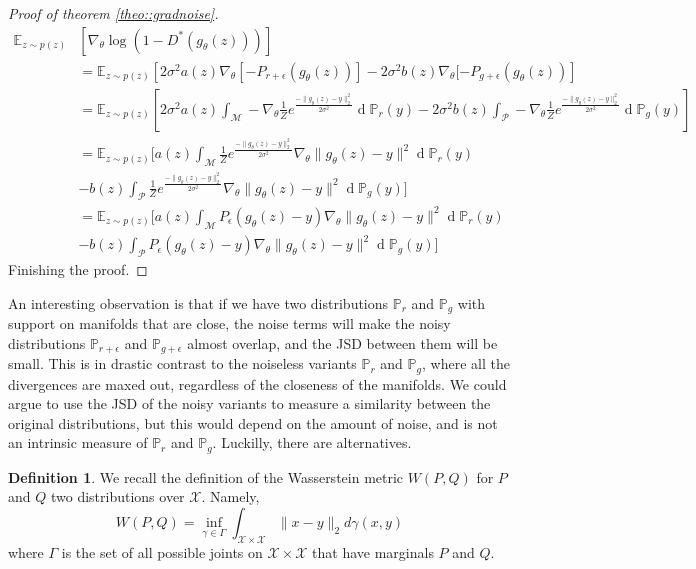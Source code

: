 \documentclass{article} %
\newcommand\EE{\mathbb{E}}
\newcommand\manP{\mathcal{P}}
\newcommand\manM{\mathcal{M}}
\newcommand\PP{\mathbb{P}}
\renewcommand{\d}[1]{\ensuremath{\operatorname{d}\!{#1}}}
\theoremstyle{definition}
\newtheorem{definition}{Definition}[section]
\begin{document}
\begin{proof}[Proof of theorem \autoref{theo::gradnoise}]
\begin{align*}
\EE_{z \sim p(z)} &\left[ \nabla_\theta \log(1 - D^*(g_\theta(z))) \right] \\
  &= \EE_{z \sim p(z)} \left[ 2\sigma^2a(z) \nabla_\theta[ - P_{r+\epsilon}(g_\theta(z))]
    - 2\sigma^2b(z) \nabla_\theta[ - P_{g + \epsilon}(g_\theta(z)) \right] \\
  &= \EE_{z \sim p(z)}\left[2\sigma^2a(z) \int_\manM -\nabla_\theta\frac{1}{Z} e^{\frac{-\|g_\theta(z)-y\|_2^2}{2 \sigma^2}} \d \PP_r(y)
    - 2\sigma^2b(z) \int_\manP -\nabla_\theta \frac{1}{Z}e^{\frac{-\|g_\theta(z)-y\|_2^2}{2 \sigma^2}} \d \PP_g(y) \right] \\
  &= \EE_{z \sim p(z)} \bigg[a(z) \int_\manM \frac{1}{Z}e^{\frac{-\|g_\theta(z)-y\|_2^2}{2 \sigma^2}} \nabla_\theta \|g_\theta(z) - y\|^2\d \PP_r(y)
    \\&- b(z) \int_\manP \frac{1}{Z} e^{\frac{-\|g_\theta(z)-y\|_2^2}{2 \sigma^2}} \nabla_\theta \|g_\theta(z) - y \|^2\d \PP_g(y)\bigg] \\
  &= \EE_{z \sim p(z)}\bigg[a(z) \int_\manM P_\epsilon(g_\theta(z)-y) \nabla_\theta 
    \|g_\theta(z)-y\|^2 \d \PP_r(y)
    \\&- b(z) \int_\manP P_\epsilon(g_\theta(z)-y) \nabla_\theta 
    \|g_\theta(z) - y\|^2 \d \PP_g(y) \bigg]
\end{align*}
Finishing the proof.
\end{proof}
An interesting observation is that if we have two distributions $\PP_r$ and $\PP_g$
with support on manifolds that
are close, the noise terms will make the noisy distributions $\PP_{r + \epsilon}$ and
$\PP_{g + \epsilon}$ almost overlap, and the JSD
between them will be small. This is in drastic contrast to the noiseless variants $\PP_r$
and $\PP_g$, where
all the divergences are maxed out, regardless of the closeness of the manifolds. We could
argue to use the JSD of the noisy variants to measure a similarity between the original
distributions, but this would depend on the amount of noise, and is not an intrinsic
measure of $\PP_r$ and $\PP_g$. Luckilly, there are alternatives.
\begin{definition}
  We recall the definition of the Wasserstein metric $W(P, Q)$ for $P$ and $Q$
two distributions over $\mathcal{X}$. Namely,
$$W(P, Q) = \inf_{\gamma \in \Gamma} \int_{\mathcal{X} \times \mathcal{X}} \|x - y \|_2 d \gamma(x, y) $$
where $\Gamma$ is the set of all possible joints on $\mathcal{X} \times \mathcal{X}$
that have marginals $P$ and $Q$. 
\end{definition}
\end{document}
